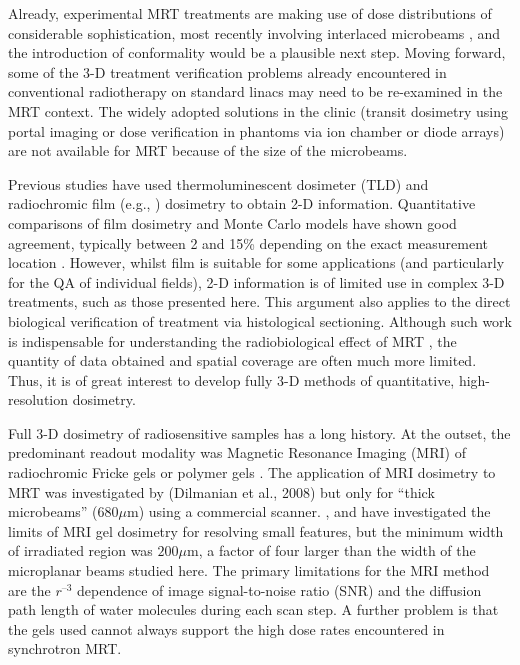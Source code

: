 	Already, experimental MRT treatments are making use of dose distributions of considerable sophistication, most recently involving interlaced microbeams \cite{brauer2013preclinical, serduc2009first,serduchigh-precision2010}, and the introduction of conformality would be a plausible next step. Moving forward, some of the 3-D treatment verification problems already encountered in conventional radiotherapy on standard linacs may need to be re-examined in the MRT context. The widely adopted solutions in the clinic (transit dosimetry using portal imaging or dose verification in phantoms via ion chamber or diode arrays) are not available for MRT because of the size of the microbeams. 
	
	Previous studies have used thermoluminescent dosimeter (TLD) \cite{ptaszkiewicz2008tld} and radiochromic film (e.g., \cite{crosbie2008method, serduchigh-precision2010}) dosimetry to obtain 2-D information. Quantitative comparisons of film dosimetry and Monte Carlo models have shown good agreement, typically between 2 and 15\% depending on the exact measurement location \cite{martinez-roviradevelopment2012}.  However, whilst film is suitable for some applications (and particularly for the QA of individual fields), 2-D information is of limited use in complex 3-D treatments, such as those presented here. This argument also applies to the direct biological verification of treatment via histological sectioning. Although such work is indispensable for understanding the radiobiological effect of MRT \cite{crosbie2010tumor}, the quantity of data obtained and spatial coverage are often much more limited. Thus, it is of great interest to develop fully 3-D methods of quantitative, high-resolution dosimetry.
	
	Full 3-D dosimetry of radiosensitive samples has a long history. At the outset, the predominant readout modality was Magnetic Resonance Imaging (MRI) of radiochromic Fricke gels \cite{appleby1987imaging, schreiner2004review} or polymer gels \cite{baldock2010polymer,maryanski1993nmr}. The application of MRI dosimetry to MRT was investigated by (Dilmanian et al., 2008) but only for “thick microbeams” ($680\mu $m) using a commercial scanner. \cite{berghigh2004}, \cite{bayrederthe2008} and \cite{heilemann2015pushing} have investigated the limits of MRI gel dosimetry for resolving small features, but the minimum width of irradiated region was $200\mu $m, a factor of four larger than the width of the microplanar beams studied here. The primary limitations for the MRI method are the $r^{–3}$ dependence of image signal-to-noise ratio (SNR) and the diffusion path length of water molecules during each scan step. A further problem is that the gels used cannot always support the high dose rates encountered in synchrotron MRT.
	
